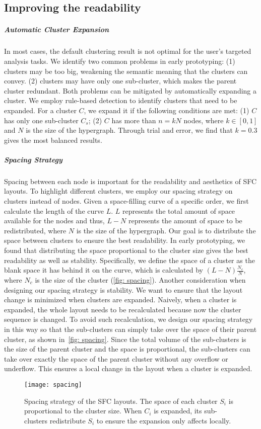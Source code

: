 \subsection{Improving the readability}
\subparagraph{Automatic Cluster Expansion}
In most cases, the default clustering result is not optimal for the user's targeted analysis tasks.
We identify two common problems in early prototyping: 
(1) clusters may be too big, weakening the semantic meaning that the clusters can convey.
(2) clusters may have only one sub-cluster, which makes the parent cluster redundant. 
Both problems can be mitigated by automatically expanding a cluster.
We employ rule-based detection to identify clusters that need to be expanded.
For a cluster $C$, we expand it if the following conditions are met:
(1) $C$ has only one sub-cluster $C_s$;
(2) $C$ has more than $n = k N$ nodes, where $k \in [0, 1]$ and $N$ is the size of the hypergraph.
Through trial and error, we find that $k=0.3$ gives the most balanced results.

\subparagraph{Spacing Strategy}
Spacing between each node is important for the readability and aesthetics of SFC layouts.
To highlight different clusters, we employ our spacing strategy on clusters instead of nodes.
Given a space-filling curve of a specific order, we first calculate the length of the curve $L$.
$L$ represents the total amount of space available for the nodes and thus,
$L - N$ represents the amount of space to be redistributed, where $N$ is the size of the hypergraph.
Our goal is to distribute the space between clusters to ensure the best readability.
In early prototyping, we found that distributing the space proportional to the cluster size gives the best readability as well as stability.
Specifically, we define the space of a cluster as the blank space it has behind it on the curve, which is calculated by $(L-N)\frac{N_c}{N}$, where $N_c$ is the size of the cluster (\autoref{fig: spacing}).
Another consideration when designing our spacing strategy is stability.
We want to ensure that the layout change is minimized when clusters are expanded.
Naively, when a cluster is expanded, the whole layout needs to be recalculated because now the cluster sequence is changed.
To avoid such recalculation, we design our spacing strategy in this way so that the sub-clusters can simply take over the space of their parent cluster, as shown in~\autoref{fig: spacing}.
Since the total volume of the sub-clusters is the size of the parent cluster and the space is proportional, the sub-clusters can take over exactly the space of the parent cluster without any overflow or underflow.
This ensures a local change in the layout when a cluster is expanded.
\begin{figure}
 \centering %
 \texttt{[image: spacing]}
 \caption{Spacing strategy of the SFC layouts. The space of each cluster $S_i$ is proportional to the cluster size. When $C_i$ is expanded, its sub-clusters redistribute $S_i$ to ensure the expansion only affects locally. }
\label{fig: spacing}
\end{figure}

